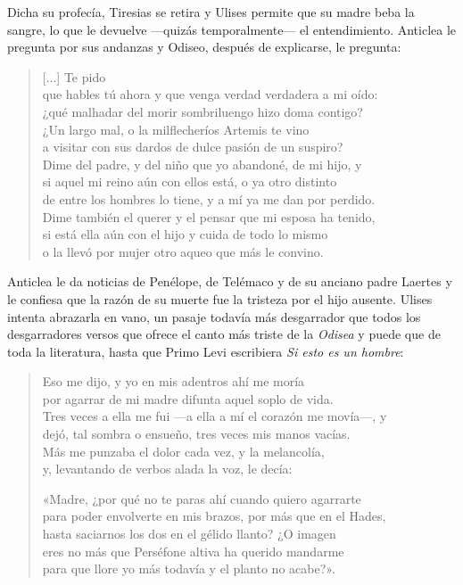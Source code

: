 Dicha su profecía, Tiresias se retira y Ulises permite que su madre beba la sangre, lo que le devuelve ---quizás temporalmente--- el entendimiento. Anticlea le pregunta por sus andanzas y Odiseo, después de explicarse, le pregunta:

\begin{verse}
[...] Te pido\\
que hables tú ahora y que venga verdad verdadera a mi oído:\\
¿qué malhadar del morir sombriluengo hizo doma contigo?\\
¿Un largo mal, o la milflecheríos Artemis te vino\\
a visitar con sus dardos de dulce pasión de un suspiro?\\
Dime del padre, y del niño que yo abandoné, de mi hijo, y\\
si aquel mi reino aún con ellos está, o ya otro distinto\\
de entre los hombres lo tiene, y a mí ya me dan por perdido.\\
Dime también el querer y el pensar que mi esposa ha tenido,\\
si está ella aún con el hijo y cuida de todo lo mismo\\
o la llevó por mujer otro aqueo que más le convino.
\end{verse}

Anticlea le da noticias de Penélope, de Telémaco y de su anciano padre Laertes y le confiesa que la razón de su muerte fue la tristeza por el hijo ausente. Ulises intenta abrazarla en vano, un pasaje todavía más desgarrador que todos los desgarradores versos que ofrece el canto más triste de la \emph{Odisea} y puede que de toda la literatura, hasta que Primo Levi escribiera \emph{Si esto es un hombre}:

\begin{verse}
Eso me dijo, y yo en mis adentros ahí me moría\\
por agarrar de mi madre difunta aquel soplo de vida.\\
Tres veces a ella me fui ---a ella a mí el corazón me movía---, y\\
dejó, tal sombra o ensueño, tres veces mis manos vacías.\\
Más me punzaba el dolor cada vez, y la melancolía,\\
y, levantando de verbos alada la voz, le decía:

«Madre, ¿por qué no te paras ahí cuando quiero agarrarte\\
para poder envolverte en mis brazos, por más que en el Hades,\\
hasta saciarnos los dos en el gélido llanto? ¿O imagen\\
eres no más que Perséfone altiva ha querido mandarme\\
para que llore yo más todavía y el planto no acabe?».
\end{verse}


